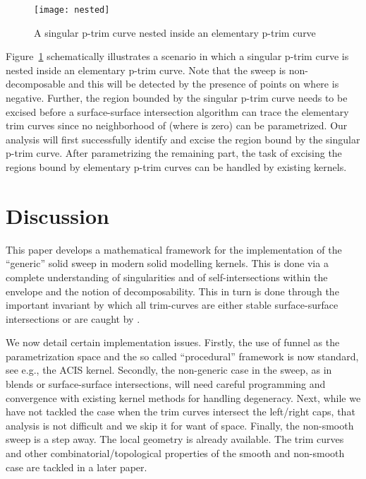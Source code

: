 \documentclass{elsart5p}
\newcommand{\eat}[1]{}
\begin{document}
\eat{
We now describe the tracing of a singular p-trim curve  once a point  in  has been located 
where  is zero.  
Since  and  meet tangentially at , starting 
at  we take small steps in direction  and  
to obtain points  and  respectively which are fed to a Newton-Raphson solver which 
returns points  and  such that ,  and 
.  Let .  
Here,  denotes the -coordinate of .
The point  is on the trim curve and the points  and  are on the p-trim curve . 
Since points  and  are non-singular, these can be fed as starting points to any of the known 
surface-surface intersection algorithms to compute the trim curve. 
}

\begin{figure}
 \centering
 \texttt{[image: nested]}
 \caption{A singular p-trim curve nested inside an elementary p-trim curve}\label{nestedFig}
\end{figure}

Figure~\ref{nestedFig} schematically illustrates a scenario in which a singular p-trim curve is nested 
inside an elementary p-trim curve.  Note that the sweep is non-decomposable and this will be detected 
by the presence of points on  where  is negative.  Further, the region bounded by the 
singular p-trim curve needs to be excised before a surface-surface intersection algorithm can trace the 
elementary trim curves since no neighborhood of  (where  is zero) can be parametrized. 
Our analysis will first successfully identify and excise the region bound by the singular p-trim curve.  
After parametrizing the remaining part, 
the task of excising the regions bound by elementary p-trim curves can be handled by existing kernels.

\section{Discussion} \label{conclusionSec}

This paper develops a mathematical framework for the implementation of the
``generic'' solid sweep in modern solid modelling kernels. This is done via
a complete understanding of singularities and of self-intersections within
the envelope and the notion of decomposability. This in turn is done
through the
important invariant  by which all trim-curves are either stable
surface-surface intersections or are caught by .

We now detail certain implementation issues. Firstly, the use of funnel as
the parametrization space and the so called ``procedural'' framework is now
standard, see e.g., the ACIS kernel. Secondly, the non-generic case in the
sweep, as in blends or surface-surface intersections, will need careful
programming and convergence with existing kernel methods for handling
degeneracy. Next, while we have not tackled the case when the trim curves
intersect the left/right caps, that analysis is not difficult and we skip
it for want of space. Finally, the non-smooth sweep is a step away. The
local geometry is already available. The trim curves and other
combinatorial/topological properties of the smooth and non-smooth case are tackled in
a later paper.
\end{document}
